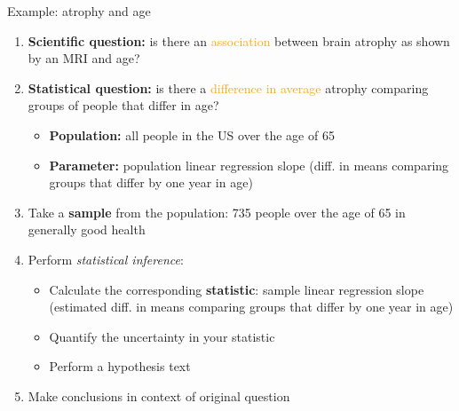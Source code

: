 \documentclass[10pt,t]{beamer}
\begin{document}
\begin{frame}{Example: atrophy and age}
\begin{enumerate}
	\item \textbf{Scientific question:} is there an \textcolor{orange}{association} between brain atrophy as shown by an MRI and age?
	\item \textbf{Statistical question:} is there a \textcolor{orange}{difference in average} atrophy comparing groups of people that differ in age? \pause
	\begin{itemize}
		\item \textbf{Population:} all people in the US over the age of 65
		\item \textbf{Parameter:} population linear regression slope (diff. in means comparing groups that differ by one year in age) \pause
	\end{itemize}
	\item Take a \textbf{sample} from the population: 735 people over the age of 65 in generally good health \pause
	\item Perform \textit{statistical inference}:
	\begin{itemize}
		\item Calculate the corresponding \textbf{statistic}: sample linear regression slope (estimated diff. in means comparing groups that differ by one year in age)\pause
		\item Quantify the uncertainty in your statistic
		\item Perform a hypothesis text
	\end{itemize} \pause
	\item Make conclusions in context of original question
\end{enumerate}
\end{frame}
\end{document}
